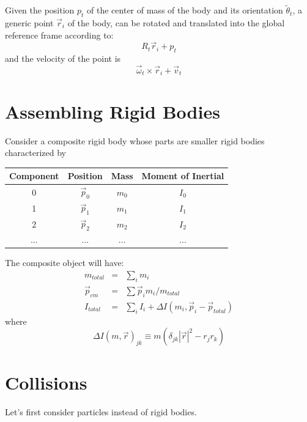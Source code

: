 \documentclass[12pt]{article}
\begin{document}
Given the position $p_t$ of the center of mass of the body and its orientation $\tilde \theta_t$, a generic point $\vec r_i$ of the body, can be rotated and translated into the global reference frame according to:
\begin{equation}
R_t \vec r_i + p_t
\end{equation}
and the velocity of the point is
\begin{equation}
\vec \omega_t \times \vec r_i + \vec v_t
\end{equation}


\section{Assembling Rigid Bodies}

Consider a composite rigid body whose parts are smaller rigid bodies characterized by
\begin{center}
\begin{tabular}{cccc} \hline
Component & Position & Mass & Moment of Inertial \\ \hline
0 & $\vec p_0$ & $m_0$ & $I_0$ \\ 
1 & $\vec p_1$ & $m_1$ & $I_1$ \\ 
2 & $\vec p_2$ & $m_2$ & $I_2$ \\ 
... & ... & ... & ... \\ \hline
\end{tabular}
\end{center}

The composite object will have:
\begin{eqnarray}
m_{total} &=& \sum_i m_i \\
\vec p_{cm} &=& \sum \vec p_i m_i/m_{total} \\
I_{total} &=& \sum_i I_i + \Delta I(m_i, \vec p_i - \vec p_{total})
\end{eqnarray}
where
\begin{equation}
\Delta I(m, \vec r)_{jk} \equiv m (\delta_{jk} |\vec r|^2 - r_j r_k)
\end{equation}

\section{Collisions}

Let's first consider particles instead of rigid bodies.
\end{document}
